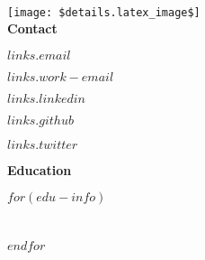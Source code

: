 \documentclass{article}
\begin{document}
    \begin{multicols}{2}
        
            \normalfont
            \pagecolor{navbar}
            \vspace{12mm}
            {\huge {}}
            \vspace{10mm}\\
            \texttt{[image: \$details.latex\_image\$]} \\


            \vspace{10mm}
            \noindent
            {\Large {\color{header}\textbf{Contact}}}
            
            \vspace{3mm}
            \textcolor{secondary}{$links.email$}
            \vspace{2mm}
            
            \textcolor{secondary}{$links.work-email$}
            \vspace{2mm}

            \textcolor{secondary}{\href{https://www.linkedin.com/in/$links.linkedin$}{$links.linkedin$}}
            \vspace{2mm}

            \textcolor{secondary}{\href{https://github.com/$links.github$}{$links.github$}}
            \vspace{2mm}

            \textcolor{secondary}{\href{$links.twitter_link$}{$links.twitter$}}
            \vspace{2mm}

            \vspace{10mm}
            \noindent
            {\Large {\color{header}\textbf{Education}}}

            \vspace{3mm}
            $for(edu-info)$
                \noindent
                \\
                \color{secondary}{$edu-info.university$}\\
                \color{secondary}{$edu-info.years$}\\
                \vspace{5mm}
            $endfor$


\end{multicols}
\end{document}
